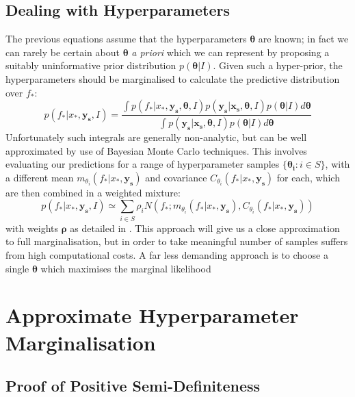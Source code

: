 \documentclass{article}
\begin{document}
\subsection{Dealing with Hyperparameters}
The previous equations assume that the hyperparameters $\bm{\theta}$ are known; in fact we can rarely be certain about $\bm{\theta}$ \emph{a priori} which we can represent by proposing a suitably uninformative prior distribution $p(\bm{\theta}|I)$. Given such a hyper-prior, the hyperparameters should be marginalised to calculate the predictive distribution over $f_*$:
\begin{equation}\label{fullmargint}
p(f_* |x_*, \mathbf{y_s},I) = \frac{\int p(f_* | x_*, \mathbf{y_s},\bm{\theta},I)p(\mathbf{y_s}|\mathbf{x_s},\bm{\theta},I)p(\bm{\theta}|I)d\bm{\theta}}{\int p(\mathbf{y_s}|\mathbf{x_s},\bm{\theta},I)p(\bm{\theta}|I)d\bm{\theta}}
\end{equation}
Unfortunately such integrals are generally non-analytic, but can be well approximated by use of Bayesian Monte Carlo \cite{bayesquad} techniques. This involves evaluating our predictions for a range of hyperparameter samples $\{ \bm{\theta_i} : i \in S\}$, with a different mean $m_{\theta_i}(f_* | x_*, \mathbf{y_s})$ and covariance $C_{\theta_i}(f_* | x_*, \mathbf{y_s})$ for each, which are then combined in a weighted mixture:
\begin{equation}
p(f_* |x_*, \mathbf{y_s},I) \simeq \sum_{i \in S} \rho_i N(f_* ; m_{\theta_i}(f_* | x_*, \mathbf{y_s}),C_{\theta_i}(f_* | x_*, \mathbf{y_s}))
\end{equation}
with weights $\bm{\rho}$ as detailed in \cite{osborne2008towards}. This approach will give us a close approximation to full marginalisation, but in order to take meaningful number of samples suffers from high computational costs. A far less demanding approach is to choose a single $\bm{\theta}$ which maximises the marginal likelihood 







\section{Approximate Hyperparameter Marginalisation}

\subsection{Proof of Positive Semi-Definiteness}
\end{document}
